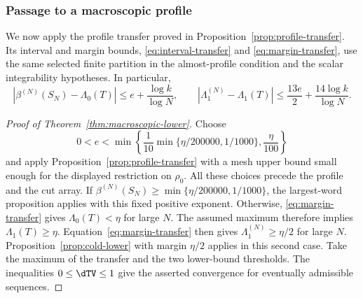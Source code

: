 \subsubsection{Passage to a macroscopic profile}

We now apply the profile transfer proved in Proposition~\ref{prop:profile-transfer}.
Its interval and margin bounds, \eqref{eq:interval-transfer} and
\eqref{eq:margin-transfer}, use the same selected finite partition in the
almost-profile condition and the scalar integrability hypotheses. In particular,
\[
 |\beta^{(N)}(S_N)-\Lambda_0(T)|\le e+\frac{\log k}{\log N},\qquad
 |\Lambda_1^{(N)}-\Lambda_1(T)|\le\frac{13e}{2}+\frac{14\log k}{\log N}.
\]


\begin{proof}[Proof of Theorem~\ref{thm:macroscopic-lower}]
Choose
\[
 0<e<\min\left\{\frac1{10}\min\{\eta/200000,1/1000\},
                          \frac{\eta}{100}\right\}
\]
and apply Proposition~\ref{prop:profile-transfer} with a mesh upper bound
small enough for the displayed restriction on $\rho_0$. All these choices
precede the profile and the cut array. If
$\beta^{(N)}(S_N)\ge\min\{\eta/200000,1/1000\}$, the largest-word
proposition applies with this fixed positive exponent. Otherwise,
\eqref{eq:margin-transfer} gives $\Lambda_0(T)<\eta$ for
large $N$. The assumed maximum therefore implies $\Lambda_1(T)\ge\eta$.
Equation~\eqref{eq:margin-transfer} then gives
$\Lambda_1^{(N)}\ge\eta/2$ for large $N$. Proposition~\ref{prop:cold-lower}
with margin $\eta/2$ applies in this second case. Take the maximum of the
transfer and the two lower-bound thresholds. The inequalities
$0\le\dTV\le1$ give the asserted convergence for eventually admissible
sequences.
\end{proof}





